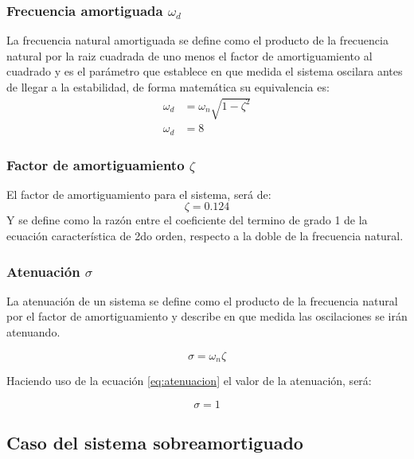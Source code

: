 \documentclass[conference]{IEEEtran}
\begin{document}
	\subsubsection{Frecuencia amortiguada $\omega_d$}
	
	La frecuencia natural amortiguada se define como el producto de la frecuencia natural por la raiz cuadrada de uno menos el factor de amortiguamiento al cuadrado y es el parámetro que establece en que medida el sistema oscilara antes de llegar a la estabilidad, de forma matemática su equivalencia es:
	\begin{align}
		\omega_d &= \omega_n \sqrt{1 - \zeta^2} \\
		\omega_d &= 8
	\end{align}
	
	\subsubsection{Factor de amortiguamiento $\zeta$}
	El factor de amortiguamiento para el sistema, será de: 
	\begin{equation}
		\zeta = 0.124
		\label{eq:sub-factor-amortiguamiento}
	\end{equation}
	Y se define como la razón entre el coeficiente del termino de grado 1 de la ecuación característica de 2do orden, respecto a la doble de la frecuencia natural.
	
	\subsubsection{Atenuación $\sigma$}
	La atenuación de un sistema se define como el producto de la frecuencia natural por el factor de amortiguamiento y describe en que medida las oscilaciones se irán atenuando.
	
	\begin{equation}
		\sigma = \omega_n \zeta
		\label{eq:atenuacion}
	\end{equation}
	
	Haciendo uso de la ecuación \ref{eq:atenuacion} el valor de la atenuación, será:
	
	\begin{equation}
		\sigma = 1
	\end{equation}
	
	\subsection{Caso del sistema sobreamortiguado}
	
\end{document}
